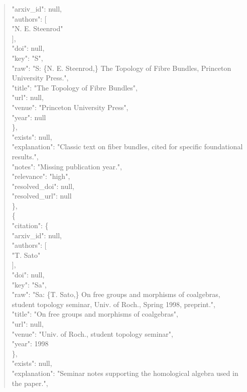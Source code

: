 \documentclass[11pt]{article}
\begin{document}
\begin{quote}
        "arxiv\_id": null,\\
        "authors": [\\
          "N. E. Steenrod"\\
        ],\\
        "doi": null,\\
        "key": "S",\\
        "raw": "S: \{N. E. Steenrod,\} The Topology of Fibre Bundles, Princeton University Press.",\\
        "title": "The Topology of Fibre Bundles",\\
        "url": null,\\
        "venue": "Princeton University Press",\\
        "year": null\\
      \},\\
      "exists": null,\\
      "explanation": "Classic text on fiber bundles, cited for specific foundational results.",\\
      "notes": "Missing publication year.",\\
      "relevance": "high",\\
      "resolved\_doi": null,\\
      "resolved\_url": null\\
    \},\\
    \{\\
      "citation": \{\\
        "arxiv\_id": null,\\
        "authors": [\\
          "T. Sato"\\
        ],\\
        "doi": null,\\
        "key": "Sa",\\
        "raw": "Sa: \{T. Sato,\} On free groups and morphisms of coalgebras, student topology seminar, Univ. of Roch., Spring 1998, preprint.",\\
        "title": "On free groups and morphisms of coalgebras",\\
        "url": null,\\
        "venue": "Univ. of Roch., student topology seminar",\\
        "year": 1998\\
      \},\\
      "exists": null,\\
      "explanation": "Seminar notes supporting the homological algebra used in the paper.",\\

\end{quote}
\end{document}
